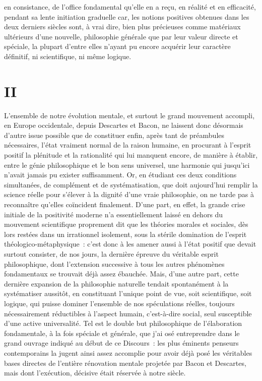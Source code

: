 \documentclass[french,twoside]{book} %
\begin{document}
en consistance, de l’office fondamental qu’elle en a reçu, en réalité et en efficacité, pendant sa lente initiation graduelle car, les notions positives obtenues dans les deux derniers siècles sont, à vrai dire, bien plus précieuses comme matériaux ultérieurs d’une nouvelle, philosophie générale que par leur valeur directe et spéciale, la plupart d’entre elles n’ayant pu encore acquérir leur caractère définitif, ni scientifique, ni même logique.
\section[{II}]{II}
\label{discours\_2}\renewcommand{\leftmark}{II}

\noindent L’ensemble de notre évolution mentale, et surtout le grand mouvement accompli, en Europe occidentale, depuis Descartes et Bacon, ne laissent donc désormais d’autre issue possible que de constituer enfin, après tant de préambules nécessaires, l’état vraiment normal de la raison humaine, en procurant à l’esprit positif la plénitude et la rationalité qui lui manquent encore, de manière à établir, entre le génie philosophique et le bon sens universel, une harmonie qui jusqu’ici n’avait jamais pu exister suffisamment. Or, en étudiant ces deux conditions simultanées, de complément et de systématisation, que doit aujourd’hui remplir la science réelle pour s’élever à la dignité d’une vraie philosophie, on ne tarde pas à reconnaître qu’elles coïncident finalement. D’une part, en effet, la grande crise initiale de la positivité moderne n’a essentiellement laissé en dehors du mouvement scientifique proprement dit que les théories morales et sociales, dès lors restées dans un irrationnel isolement, sous la stérile domination de l’esprit théologico-métaphysique : c’est donc à les amener aussi à l’état positif que devait surtout consister, de nos jours, la dernière épreuve du véritable esprit philosophique, dont l’extension successive à tous les autres phénomènes fondamentaux se trouvait déjà assez ébauchée. Mais, d’une autre part, cette dernière expansion de la philosophie naturelle tendait spontanément à la systématiser aussitôt, en constituant l’unique point de vue, soit scientifique, soit logique, qui puisse dominer l’ensemble de nos spéculations réelles, toujours nécessairement réductibles à l’aspect humain, c’est-à-dire social, seul susceptible d’une active universalité. Tel est le double but philosophique de l’élaboration fondamentale, à la fois spéciale et générale, que j’ai osé entreprendre dans le grand ouvrage indiqué au début de ce Discours : les plus éminents penseurs contemporains la jugent ainsi assez accomplie pour avoir déjà posé les véritables bases directes de l’entière rénovation mentale projetée par Bacon et Descartes, mais dont l’exécution, décisive était réservée à notre siècle.\par
\end{document}
